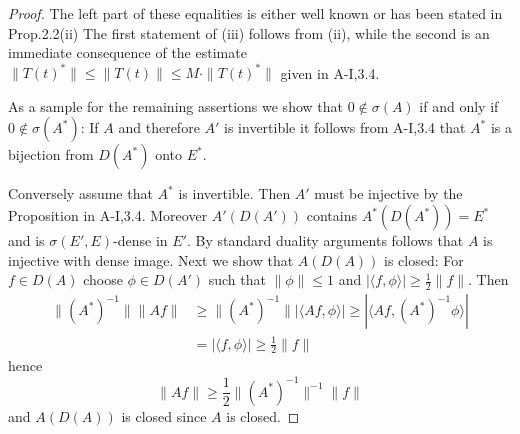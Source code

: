 \begin{proof}
The left part of these equalities is either well known or has been stated in Prop.2.2(ii)
The first statement of (iii) follows from (ii), while the second is an immediate consequence of the estimate $\|T(t)^*\| \leq \|T(t)\| \leq M\cdot\|T(t)^*\|$ given in A-I,3.4.

As a sample for the remaining assertions we show that $0 \notin \sigma(A)$ if and only if $0 \notin \sigma(A^*)$:
If $A$ and therefore $A'$ is invertible it follows from A-I,3.4 that $A^*$ is a bijection from $D(A^*)$ onto $E^*$.

Conversely assume that $A^*$ is invertible.
Then $A'$ must be injective by the Proposition in A-I,3.4.
Moreover $A'(D(A'))$ contains $A^*(D(A^*)) = E^*$ and is $\sigma(E',E)$-dense in $E'$.
By standard duality arguments follows that $A$ is injective with dense image.
Next we show that $A(D(A))$ is closed: For $f \in D(A)$ choose $\phi \in D(A')$ such that $\|\phi\| \leq 1$ and $|\langle f,\phi \rangle| \geq \frac{1}{2}\|f\|$.
Then
\begin{align*}
\|(A^*)^{-1}\| \|Af\| &\geq \|(A^*)^{-1}\| |\langle Af,\phi \rangle| \geq |\langle Af,(A^*)^{-1}\phi \rangle| \\
&= |\langle f,\phi \rangle| \geq \frac{1}{2}\|f\|
\end{align*}
hence
\[
\|Af\| \geq \frac{1}{2}\|(A^*)^{-1}\|^{-1}\|f\|
\]
and $A(D(A))$ is closed since $A$ is closed.
\end{proof}

